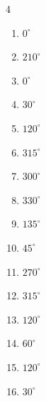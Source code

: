 \begin{multicols}{4}
\begin{enumerate}
  \item $\displaystyle 0^{\circ}$
        \phantom{$\displaystyle =0$}

  \item $\displaystyle 210^{\circ}$

  \item $\displaystyle 0^{\circ}$
        \phantom{$\displaystyle =0$}

  \item $\displaystyle 30^{\circ}$

  \item $\displaystyle 120^{\circ}$

  \item $\displaystyle 315^{\circ}$

  \item $\displaystyle 300^{\circ}$

  \item $\displaystyle 330^{\circ}$

  \item $\displaystyle 135^{\circ}$

  \item $\displaystyle 45^{\circ}$

  \item $\displaystyle 270^{\circ}$

  \item $\displaystyle 315^{\circ}$

  \item $\displaystyle 120^{\circ}$

  \item $\displaystyle 60^{\circ}$

  \item $\displaystyle 120^{\circ}$

  \item $\displaystyle 30^{\circ}$


\end{enumerate}
\end{multicols}
